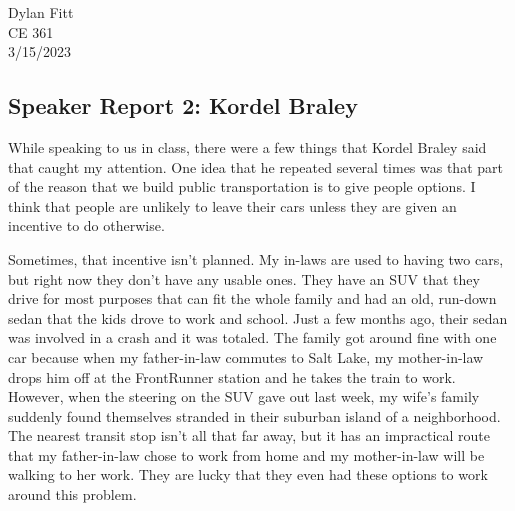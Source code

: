 \documentclass[12pt]{article}
\begin{document}
	\begin{flushright}
		Dylan Fitt\\
		CE 361\\
		3/15/2023
	\end{flushright}
	\begin{centering}
		\subsection*{Speaker Report 2: Kordel Braley}
	\end{centering}
	

	While speaking to us in class,
	there were a few things that Kordel Braley said that caught my
	attention.
	One idea that he repeated several times was that part of the reason
	that we build public transportation is to give people options.
	I think that people are unlikely to leave their cars
	unless they are given an incentive to do otherwise.
	
	Sometimes, that incentive isn't planned.
	My in-laws are used to having two cars,
	but right now they don't have any usable ones.
	They have an SUV that they drive for most purposes
	that can fit the whole family
	and had an old, run-down sedan that the kids drove to work and
	school.
	Just a few months ago,
	their sedan was involved in a crash and it was totaled.
	The family got around fine with one car
	because when my father-in-law commutes to Salt Lake,
	my mother-in-law drops him off at the FrontRunner station
	and he takes the train to work.
	However,
	when the steering on the SUV gave out last week,
	my wife's family suddenly found themselves stranded in their suburban
	island of a neighborhood.
	The nearest transit stop isn't all that far away,
	but it has an impractical route
	that my father-in-law chose to work from home
	and my mother-in-law will be walking to her work.
	They are lucky that they even had these options to work around
	this problem.
	
\end{document}

